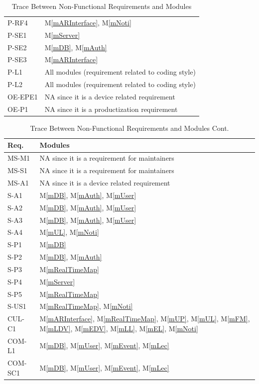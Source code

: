 \documentclass[12pt, titlepage]{article}
\newcommand{\mref}[1]{M\ref{#1}}
\begin{document}
\begin{table}[H]
\begin{tabular}{p{} p{}}
P-RF4 & \mref{mARInterface}, \mref{mNoti}\\
P-SE1 & \mref{mServer}\\
P-SE2 & \mref{mDB}, \mref{mAuth}\\
P-SE3 & \mref{mARInterface}\\
P-L1 & All modules (requirement related to coding style)\\
P-L2 & All modules (requirement related to coding style)\\
OE-EPE1 & NA since it is a device related requirement\\
OE-P1 & NA since it is a productization requirement\\
\bottomrule
\end{tabular}
\caption{Trace Between Non-Functional Requirements and Modules}
\label{TblNFRT}
\end{table}

\begin{table}[H]
\centering
\begin{tabular}{p{} p{}}
\toprule
\textbf{Req.} & \textbf{Modules}\\
\midrule
MS-M1 & NA since it is a requirement for maintainers\\
MS-S1 & NA since it is a requirement for maintainers\\
MS-A1 & NA since it is a device related requirement\\
S-A1 & \mref{mDB}, \mref{mAuth}, \mref{mUser}\\
S-A2 & \mref{mDB}, \mref{mAuth}, \mref{mUser}\\
S-A3 & \mref{mDB}, \mref{mAuth}, \mref{mUser}\\
S-A4 & \mref{mUL}, \mref{mNoti}\\
S-P1 & \mref{mDB}\\
S-P2 & \mref{mDB}, \mref{mAuth}\\
S-P3 & \mref{mRealTimeMap}\\
S-P4 & \mref{mServer}\\
S-P5 & \mref{mRealTimeMap}\\
S-US1 & \mref{mRealTimeMap}, \mref{mNoti}\\
CUL-C1 & \mref{mARInterface}, \mref{mRealTimeMap}, \mref{mUP}, \mref{mUL}, \mref{mFM}, \mref{mLDV}, \mref{mEDV}, \mref{mLL}, \mref{mEL}, \mref{mNoti}\\
COM-L1 & \mref{mDB}, \mref{mUser}, \mref{mEvent}, \mref{mLec}\\
COM-SC1 & \mref{mDB}, \mref{mUser}, \mref{mEvent}, \mref{mLec}\\
\bottomrule
\end{tabular}
\caption{Trace Between Non-Functional Requirements and Modules Cont.}
\label{TblNFRT-CONT}
\end{table}
\end{document}
